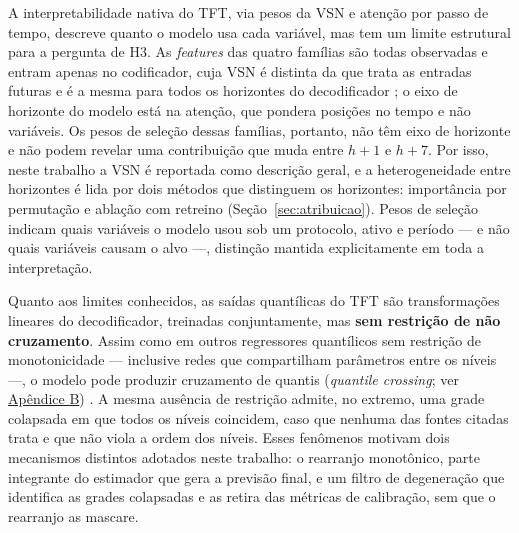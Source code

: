 A interpretabilidade nativa do TFT, via pesos da VSN e atenção por passo de tempo, descreve quanto o modelo usa cada variável, mas tem um limite estrutural para a pergunta de H3. As \textit{features} das quatro famílias são todas observadas e entram apenas no codificador, cuja VSN é distinta da que trata as entradas futuras e é a mesma para todos os horizontes do decodificador \cite[Seções~4.2 e 4.5.1]{LIMETAL2021TFT}; o eixo de horizonte do modelo está na atenção, que pondera posições no tempo e não variáveis. Os pesos de seleção dessas famílias, portanto, não têm eixo de horizonte e não podem revelar uma contribuição que muda entre \(h+1\) e \(h+7\). Por isso, neste trabalho a VSN é reportada como descrição geral, e a heterogeneidade entre horizontes é lida por dois métodos que distinguem os horizontes: importância por permutação e ablação com retreino (Seção~\ref{sec:atribuicao}). Pesos de seleção indicam quais variáveis o modelo usou sob um protocolo, ativo e período --- e não quais variáveis causam o alvo ---, distinção mantida explicitamente em toda a interpretação.

Quanto aos limites conhecidos, as saídas quantílicas do TFT são transformações lineares do decodificador, treinadas conjuntamente, mas \textbf{sem restrição de não cruzamento}. Assim como em outros regressores quantílicos sem restrição de monotonicidade --- inclusive redes que compartilham parâmetros entre os níveis \cite{CANNON2018} ---, o modelo pode produzir cruzamento de quantis (\textit{quantile crossing}; ver \hyperref[gl:crossing]{Apêndice B}) \cite{KOENKER2005,CHERNOZHUKOV2010REARRANGEMENT,BONDELL2010,CANNON2018}. A mesma ausência de restrição admite, no extremo, uma grade colapsada em que todos os níveis coincidem, caso que nenhuma das fontes citadas trata e que não viola a ordem dos níveis. Esses fenômenos motivam dois mecanismos distintos adotados neste trabalho: o rearranjo monotônico, parte integrante do estimador que gera a previsão final, e um filtro de degeneração que identifica as grades colapsadas e as retira das métricas de calibração, sem que o rearranjo as mascare.

